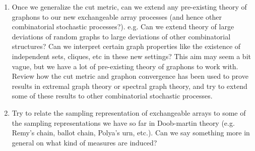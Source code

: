 \documentclass[11pt,oneside,reqno]{article}
\makeatletter
\theoremstyle{plain}
\theoremstyle{definition}
\newcounter{ctr}\loop\stepcounter{ctr}\edef\X{\@Alph\c@ctr}%
\numberwithin{equation}{section}
\newcommand{\daniel}[1]{\textcolor{Emerald}{Daniel comment: #1}}
\makeatother
\begin{document}
\begin{enumerate}
\begin{itemize}
        \item \textbf{GOAL:} relate the cut metric to the sampling representation for graphons we deduced above. Maybe this can give us an idea of how to define the metric in a more general setting. It may depend on what the state space $E$ is of the array of course, so maybe we assume this is some kind of metric space in its own right.

        \item \textbf{GOAL:} Show that convergence in this extended cut metric is equivalent to convergence of the embedding densities (and hence also in the Doob-Martin topology). 

        \begin{itemize}
            \item Find a suitable notion of embedding a finite array $x$ into our space of representation functions, analogous to how finite graphs are embedded in the space of graphons just by discretizing the adjacency matrix. This should be done in such a way so that the embedding density $t(F, x)$ is the same whether we view $x$ as a finite array or as a representation function. 
        \end{itemize}

        \item This would be really cool if we could do this, as this could feasibly give us a way of comparing the exchangeable arrays corresponding to completely different combinatorial processes.

        \daniel{This is an interesting idea. Maybe this would depend on the realization as an exchangeable array.}
    \end{itemize}


    \item Once we generalize the cut metric, can we extend any pre-existing theory of graphons to our new exchangeable array processes (and hence other combinatorial stochastic processes?). e.g. Can we extend theory of large deviations of random graphs to large deviations of other combinatorial structures? Can we interpret certain graph properties like the existence of independent sets, cliques, etc in these new settings? This aim may seem a bit vague, but we have a lot of pre-existing theory of graphons to work with. Review how the cut metric and graphon convergence has been used to prove results in extremal graph theory or spectral graph theory, and try to extend some of these results to other combinatorial stochastic processes.  

    \item Try to relate the sampling representation of exchangeable arrays to some of the sampling representations we have so far in Doob-martin theory (e.g. Remy's chain, ballot chain, Polya's urn, etc.). Can we say something more in general on what kind of measures are induced?


\end{enumerate}
\end{document}
